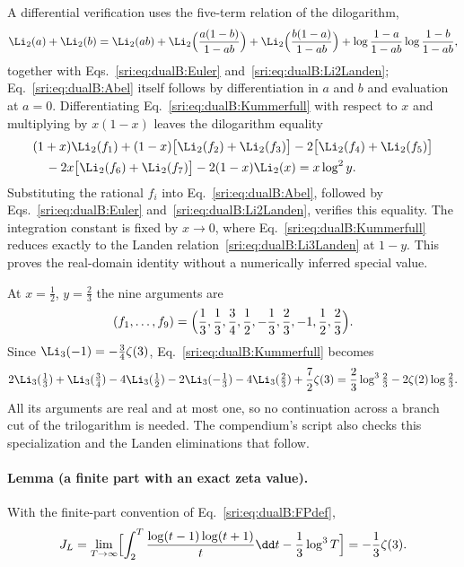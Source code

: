 A differential verification uses the five-term relation of the dilogarithm,
\begin{equation}
 \Li_2(a)+\Li_2(b)=\Li_2(ab)+\Li_2\Bigl(\frac{a(1-b)}{1-ab}\Bigr)+\Li_2\Bigl(\frac{b(1-a)}{1-ab}\Bigr)
 +\log\frac{1-a}{1-ab}\log\frac{1-b}{1-ab},
 \label{sri:eq:dualB:Abel}
\end{equation}
together with Eqs.~\eqref{sri:eq:dualB:Euler} and~\eqref{sri:eq:dualB:Li2Landen}; Eq.~\eqref{sri:eq:dualB:Abel} itself follows by
differentiation in $a$ and $b$ and evaluation at $a=0$. Differentiating Eq.~\eqref{sri:eq:dualB:Kummerfull} with respect
to $x$ and multiplying by $x(1-x)$ leaves the dilogarithm equality
\begin{equation}
\begin{aligned}
 &(1+x)\Li_2(f_1)+(1-x)\bigl[\Li_2(f_2)+\Li_2(f_3)\bigr]-2\bigl[\Li_2(f_4)+\Li_2(f_5)\bigr]\\
 &\quad-2x\bigl[\Li_2(f_6)+\Li_2(f_7)\bigr]-2(1-x)\Li_2(x)=x\log^2y.
\end{aligned}
\label{sri:eq:dualB:Kummerdiff}
\end{equation}
Substituting the rational $f_i$ into Eq.~\eqref{sri:eq:dualB:Abel}, followed by Eqs.~\eqref{sri:eq:dualB:Euler}
and~\eqref{sri:eq:dualB:Li2Landen}, verifies this equality. The integration constant is fixed by $x\to0$, where
Eq.~\eqref{sri:eq:dualB:Kummerfull} reduces exactly to the Landen relation~\eqref{sri:eq:dualB:Li3Landen} at $1-y$. This
proves the real-domain identity without a numerically inferred special value.

At $x=\frac12$, $y=\frac23$ the nine arguments are
\begin{equation}
 (f_1,\ldots,f_9)=\Bigl(\frac13,\frac13,\frac34,\frac12,-\frac13,\frac23,-1,\frac12,\frac23\Bigr).
\end{equation}
Since $\Li_3(-1)=-\frac34\zeta(3)$, Eq.~\eqref{sri:eq:dualB:Kummerfull} becomes
\begin{equation}
 2\Li_3(\tfrac13)+\Li_3(\tfrac34)-4\Li_3(\tfrac12)-2\Li_3(-\tfrac13)-4\Li_3(\tfrac23)+\frac72\zeta(3)
 =\frac23\log^3\tfrac23-2\zeta(2)\log\tfrac23.
 \label{sri:eq:dualB:Kspecial}
\end{equation}
All its arguments are real and at most one, so no continuation across a branch cut of the trilogarithm is needed. The
compendium's script  also checks
this specialization and the Landen eliminations that follow.

\paragraph{Lemma (a finite part with an exact zeta value).} With the finite-part convention
of Eq.~\eqref{sri:eq:dualB:FPdef},
\begin{equation}
 J_L=\lim_{T\to\infty}\Bigl[\int_2^T\frac{\log(t-1)\log(t+1)}{t}\dd t-\frac13\log^3T\Bigr]=-\frac13\zeta(3).
 \label{sri:eq:dualB:JL}
\end{equation}

